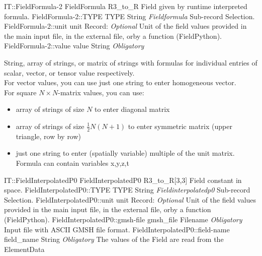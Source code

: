\begin{RecordType}
	{IT::FieldFormula-2}
	{FieldFormula}
	{} %
	{} %
	{{{R3{\_}to{\_}R Field given by runtime interpreted formula.}}}
		\RecKey
			{FieldFormula-2::TYPE}
			{TYPE}
			{{String}}
			{ \it{Fieldformula} }
			{{{Sub-record Selection.}}}
		\RecKey
			{FieldFormula-2::unit}
			{unit}
			{{Record}{: }}
			{ \it{Optional} }
			{{{Unit of the field values provided in the main input file, in the external file, orby a function (FieldPython).}}}
		\RecKey
			{FieldFormula-2::value}
			{value}
			{{String}}
			{ \it{Obligatory} }
			{{{{String, array of strings, or matrix of strings with formulas for individual entries of scalar, vector, or tensor value respectively.}\\{
For vector values, you can use just one string to enter homogeneous vector.}\\{
For square }{$N\times N$}{-matrix values, you can use:}
}
\begin{itemize}
\item {array of strings of size }{$N$}{ to enter diagonal matrix}
\item {array of strings of size }{$\frac12N(N+1)$}{ to enter symmetric matrix (upper triangle, row by row)}
\item {just one string to enter (spatially variable) multiple of the unit matrix.}\\{
Formula can contain variables }\ttfamily x,y,z,t
\end{itemize}
}}
\end{RecordType}
\begin{RecordType}
	{IT::FieldInterpolatedP0}
	{FieldInterpolatedP0}
	{} %
	{} %
	{{{R3{\_}to{\_}R[3,3] Field constant in space.}}}
		\RecKey
			{FieldInterpolatedP0::TYPE}
			{TYPE}
			{{String}}
			{ \it{Fieldinterpolatedp0} }
			{{{Sub-record Selection.}}}
		\RecKey
			{FieldInterpolatedP0::unit}
			{unit}
			{{Record}{: }}
			{ \it{Optional} }
			{{{Unit of the field values provided in the main input file, in the external file, orby a function (FieldPython).}}}
		\RecKey
			{FieldInterpolatedP0::gmsh-file}
			{gmsh{\_}file}
			{{Filename}}
			{ \it{Obligatory} }
			{{{Input file with ASCII GMSH file format.}}}
		\RecKey
			{FieldInterpolatedP0::field-name}
			{field{\_}name}
			{{String}}
			{ \it{Obligatory} }
			{{{The values of the Field are read from the }\ttfamily {\$}ElementData}}
\end{RecordType}
